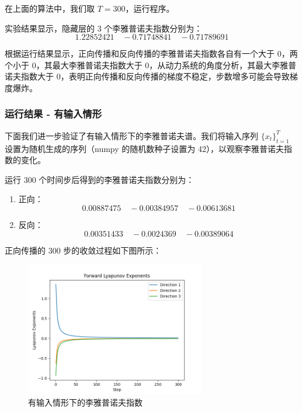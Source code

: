 在上面的算法中，我们取 $T=300$，运行程序。

实验结果显示，隐藏层的 3 个李雅普诺夫指数分别为：
\begin{equation}
  1.22852421\quad-0.71748841\quad-0.71789691
\end{equation}

根据运行结果显示，正向传播和反向传播的李雅普诺夫指数各自有一个大于 0，两个小于 0，其最大李雅普诺夫指数大于 0，从动力系统的角度分析，其最大李雅普诺夫指数大于 0，表明正向传播和反向传播的梯度不稳定，步数增多可能会导致梯度爆炸。

\subsubsection{运行结果 - 有输入情形}

下面我们进一步验证了有输入情形下的李雅普诺夫谱。我们将输入序列 $\{x_t\}_{t=1}^T$ 设置为随机生成的序列（numpy 的随机数种子设置为 42），以观察李雅普诺夫指数的变化。

运行 300 个时间步后得到的李雅普诺夫指数分别为：

\begin{enumerate}
  \item 正向：
  \begin{equation}
    0.00887475\quad-0.00384957\quad-0.00613681
  \end{equation}
  \item 反向：
  \begin{equation}
    0.00351433\quad-0.0024369\quad-0.00389064
  \end{equation}
\end{enumerate}

正向传播的 300 步的收敛过程如下图所示：

\begin{figure}[htbp]
  \centering
  \includegraphics[width=0.7\textwidth]{figures/lyapunov_exponents_forward_with_input.png}
  \caption{有输入情形下的李雅普诺夫指数}
  \label{fig:example}
\end{figure}

